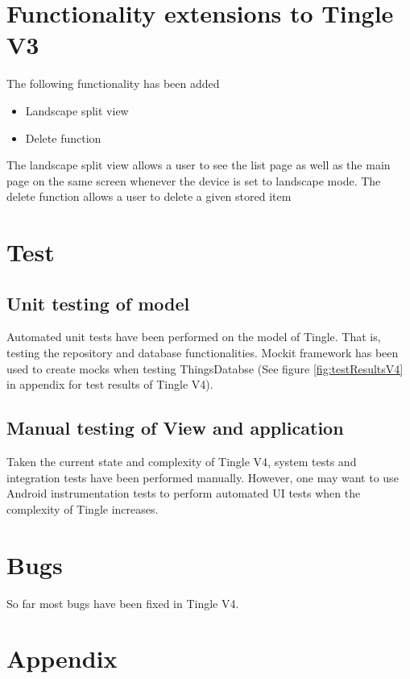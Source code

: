 \documentclass{article}
\begin{document}
\section{Functionality extensions to Tingle V3}
The following functionality has been added
\begin{itemize}
	\item Landscape split view
	\item Delete function

\end{itemize}
The landscape split view allows a user to see the list page as well as the main page on the same screen whenever the device is set to landscape mode. The delete function allows a user to delete a given stored item

\section{Test}
\subsection{Unit testing of model}
Automated unit tests have been performed on the model of Tingle. That is, testing the repository and database functionalities. Mockit framework has been used to create mocks when testing ThingsDatabse (See figure \ref{fig:testResultsV4} in appendix for test results of Tingle V4).

\subsection{Manual testing of View and application}
Taken the current state and complexity of Tingle V4, system tests and integration tests have been performed manually. However, one may want to use Android instrumentation tests to perform automated UI tests when the complexity of Tingle increases.  


\section{Bugs}
So far most bugs have been fixed in Tingle V4. 

\newpage
\section{Appendix}
\end{document}

